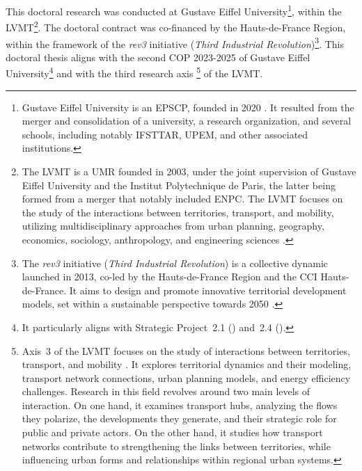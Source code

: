 This doctoral research was conducted at Gustave Eiffel University\footnote{
    Gustave Eiffel University is an \acrfull{EPSCP}, founded in 2020 \textcolor{blue}{\autocite{universite_gustave_eiffel_notre_2024}}. It resulted from the merger and consolidation of a university, a research organization, and several schools, including notably \acrfull{IFSTTAR}, \acrfull{UPEM}, and other associated institutions.
}, within the \acrfull{LVMT}\footnote{
    The \acrfull{LVMT} is a \acrfull{UMR} founded in 2003, under the joint supervision of Gustave Eiffel University and the Institut Polytechnique de Paris, the latter being formed from a merger that notably included \acrfull{ENPC}. The \acrshort{LVMT} focuses on the study of the interactions between territories, transport, and mobility, utilizing multidisciplinary approaches from urban planning, geography, economics, sociology, anthropology, and engineering sciences \textcolor{blue}{\autocite{laboratoire_ville_mobilite_transport_presentation_2024}}.
}. The doctoral contract was co-financed by the Hauts-de-France Region, within the framework of the \textsl{rev3} initiative (\textsl{Third Industrial Revolution})\footnote{
    The \textsl{rev3} initiative (\textsl{Third Industrial Revolution}) is a collective dynamic launched in 2013, co-led by the Hauts-de-France Region and the \acrfull{CCI} Hauts-de-France. It aims to design and promote innovative territorial development models, set within a sustainable perspective towards 2050 \textcolor{blue}{\autocite{rev3_rev3_2022}}.
}. This doctoral thesis aligns with the second \acrfull{COP} 2023-2025 of Gustave Eiffel University\footnote{
    It particularly aligns with Strategic Project~2.1 () and~2.4 ().
} and with the third research axis \footnote{
    Axis~3  of the \acrfull{LVMT} focuses on the study of interactions between territories, transport, and mobility \textcolor{blue}{\autocite{laboratoire_ville_mobilite_transport_axe_2024}}. It explores territorial dynamics and their modeling, transport network connections, urban planning models, and energy efficiency challenges. Research in this field revolves around two main levels of interaction. On one hand, it examines transport hubs, analyzing the flows they polarize, the developments they generate, and their strategic role for public and private actors. On the other hand, it studies how transport networks contribute to strengthening the links between territories, while influencing urban forms and relationships within regional urban systems.
} of the \acrshort{LVMT}.%
